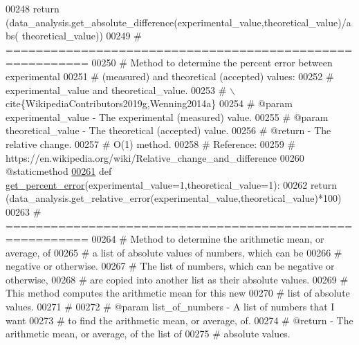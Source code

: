 \begin{DoxyCode}
{00248         \textcolor{keywordflow}{return} (data\_analysis.get\_absolute\_difference(experimental\_value,theoretical\_value)/abs(
      theoretical\_value))
00249     \textcolor{comment}{# =========================================================}
00250     \textcolor{comment}{#   Method to determine the percent error between experimental}
00251     \textcolor{comment}{#       (measured) and theoretical (accepted) values:}
00252     \textcolor{comment}{#       experimental\_value and theoretical\_value.}
00253     \textcolor{comment}{#   \(\backslash\)cite\{WikipediaContributors2019g,Wenning2014a\}}
00254     \textcolor{comment}{#   @param experimental\_value - The experimental (measured) value.}
00255     \textcolor{comment}{#   @param theoretical\_value - The theoretical (accepted) value.}
00256     \textcolor{comment}{#   @return - The relative change.}
00257     \textcolor{comment}{#   O(1) method.}
00258     \textcolor{comment}{#   Reference:}
00259     \textcolor{comment}{#       https://en.wikipedia.org/wiki/Relative\_change\_and\_difference}
00260     @staticmethod
\hypertarget{data__analysis__tool_8py_source_l00261}{}\hyperlink{classstatistics_1_1data__analysis__tool_1_1data__analysis_a2c0e62016c7d45cc39b71372ccb6d028}{00261}     \textcolor{keyword}{def }\hyperlink{classstatistics_1_1data__analysis__tool_1_1data__analysis_a2c0e62016c7d45cc39b71372ccb6d028}{get\_percent\_error}(experimental\_value=1,theoretical\_value=1):
00262         \textcolor{keywordflow}{return} (data\_analysis.get\_relative\_error(experimental\_value,theoretical\_value)*100)
00263     \textcolor{comment}{# =========================================================}
00264     \textcolor{comment}{#   Method to determine the arithmetic mean, or average, of}
00265     \textcolor{comment}{#       a list of absolute values of numbers, which can be}
00266     \textcolor{comment}{#       negative or otherwise.}
00267     \textcolor{comment}{#   The list of numbers, which can be negative or otherwise,}
00268     \textcolor{comment}{#       are copied into another list as their absolute values.}
00269     \textcolor{comment}{#   This method computes the arithmetic mean for this new}
00270     \textcolor{comment}{#       list of absolute values.}
00271     \textcolor{comment}{#   }
00272     \textcolor{comment}{#   @param list\_of\_numbers - A list of numbers that I want}
00273     \textcolor{comment}{#       to find the arithmetic mean, or average, of.}
00274     \textcolor{comment}{#   @return - The arithmetic mean, or average, of the list of}
00275     \textcolor{comment}{#       absolute values.}
}
\end{DoxyCode}
